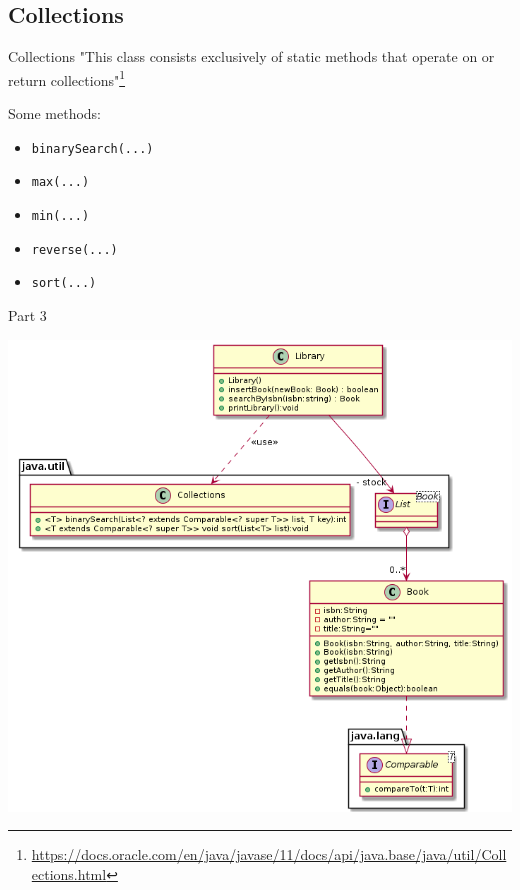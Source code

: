 	\subsection{Collections}
	\begin{frame}{Collections}
		"This class consists exclusively of static methods that operate on or return collections"\footnote{\url{https://docs.oracle.com/en/java/javase/11/docs/api/java.base/java/util/Collections.html}}
		
		Some methods:
		\begin{itemize}
			\item \texttt{binarySearch(...)}
			\item \texttt{max(...)}
			\item \texttt{min(...)}
			\item \texttt{reverse(...)}
			\item \texttt{sort(...)}
		\end{itemize}
	\end{frame}
	\begin{frame}{Part 3}
		
		\begin{center}
			\includegraphics[scale=.34]{07_collection/hands_on_03.png}
		\end{center}
		
	\end{frame}
	
